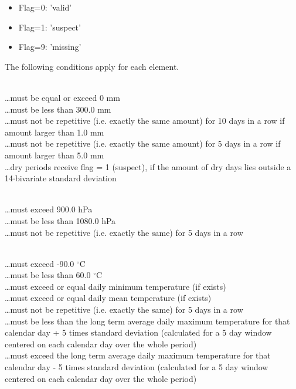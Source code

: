 \documentclass[a4paper,11pt]{article}
\begin{document}
\begin{itemize}
\item Flag=0: 'valid'
\item Flag=1: 'suspect'
\item Flag=9: 'missing'
\end{itemize}

The following conditions apply for each element.
\medskip

\\
\ldots must be equal or exceed 0 mm\\
\ldots must be less than 300.0 mm\\
\ldots must not be repetitive (i.e. exactly the same amount) for 10
days in a row if amount larger than 1.0 mm\\
\ldots must not be repetitive (i.e. exactly the same amount) for 5
days in a row if amount larger than 5.0 mm\\
\ldots dry periods receive flag = 1 (suspect), if the amount of dry
days lies outside a 14$\cdot$bivariate standard deviation
\medskip

\\
\ldots must exceed 900.0 hPa\\
\ldots must be less than 1080.0 hPa\\
\ldots must not be repetitive (i.e. exactly the same) for 5 days in a row
\medskip

\\
\ldots must exceed -90.0 $^{\circ}$C\\
\ldots must be less than 60.0 $^{\circ}$C\\
\ldots must exceed or equal daily minimum temperature (if exists)\\
\ldots must exceed or equal daily mean temperature (if exists)\\
\ldots must not be repetitive (i.e. exactly the same) for 5 days in a row\\
\ldots must be less than the long term average daily maximum
temperature for that calendar day + 5 times standard deviation
(calculated for a 5 day window centered on each calendar day over the
whole period)\\
\ldots must exceed the long term average daily maximum temperature for
that calendar day - 5 times standard deviation (calculated for a 5 day
window centered on each calendar day over the whole period)
\medskip
\end{document}
